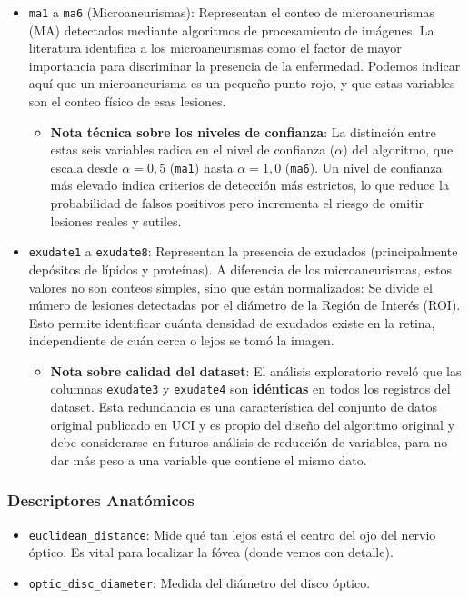 \begin{itemize}
    \item \texttt{ma1} a \texttt{ma6} (Microaneurismas): Representan el conteo de microaneurismas (MA) detectados mediante algoritmos de procesamiento de imágenes. La literatura identifica a los microaneurismas como el factor de mayor importancia para discriminar la presencia de la enfermedad. Podemos indicar aquí que un microaneurisma es un pequeño punto rojo, y que estas variables son el conteo físico de esas lesiones.
    \begin{itemize}
        \item \textbf{Nota técnica sobre los niveles de confianza}: La distinción entre estas seis variables radica en el nivel de confianza ($\alpha$) del algoritmo, que escala desde $\alpha = 0{,}5$ (\texttt{ma1}) hasta $\alpha = 1{,}0$ (\texttt{ma6}). Un nivel de confianza más elevado indica criterios de detección más estrictos, lo que reduce la probabilidad de falsos positivos pero incrementa el riesgo de omitir lesiones reales y sutiles.
    \end{itemize}
    \item \texttt{exudate1} a \texttt{exudate8}: Representan la presencia de exudados (principalmente depósitos de lípidos y proteínas). A diferencia de los microaneurismas, estos valores no son conteos simples, sino que están normalizados: Se divide el número de lesiones detectadas por el diámetro de la Región de Interés (ROI). Esto permite identificar cuánta densidad de exudados existe en la retina, independiente de cuán cerca o lejos se tomó la imagen.
    \begin{itemize}
        \item \textbf{Nota sobre calidad del dataset}: El análisis exploratorio reveló que las columnas \texttt{exudate3} y \texttt{exudate4} son \textbf{idénticas} en todos los registros del dataset. Esta redundancia es una característica del conjunto de datos original publicado en UCI y es propio del diseño del algoritmo original y debe considerarse en futuros análisis de reducción de variables, para no dar más peso a una variable que contiene el mismo dato.
    \end{itemize}
\end{itemize}

\subsubsection{Descriptores Anatómicos}

\begin{itemize}
    \item \texttt{euclidean\_distance}: Mide qué tan lejos está el centro del ojo del nervio óptico. Es vital para localizar la fóvea (donde vemos con detalle).
    \item \texttt{optic\_disc\_diameter}: Medida del diámetro del disco óptico.
\end{itemize}


